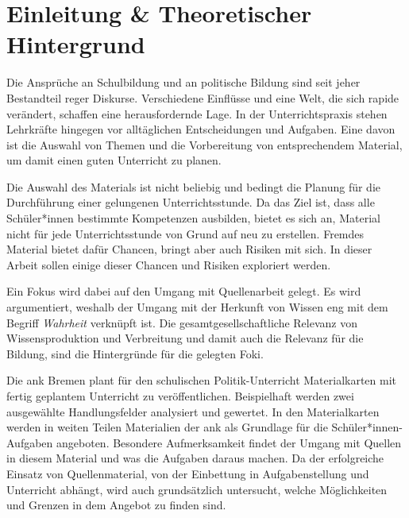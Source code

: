 



\section{Einleitung \& Theoretischer Hintergrund}
Die Ansprüche an Schulbildung und an politische Bildung sind seit jeher Bestandteil reger Diskurse. Verschiedene Einflüsse und eine Welt, die sich rapide verändert, schaffen eine herausfordernde Lage. In der Unterrichtspraxis stehen Lehrkräfte hingegen vor alltäglichen Entscheidungen und Aufgaben. Eine davon ist die Auswahl von Themen und die Vorbereitung von entsprechendem Material, um damit einen guten Unterricht zu planen. 

Die Auswahl des Materials ist nicht beliebig und bedingt die Planung für die Durchführung einer gelungenen Unterrichtsstunde. Da das Ziel ist, dass alle Schüler*innen bestimmte Kompetenzen ausbilden, bietet es sich an, Material nicht für jede Unterrichtsstunde von Grund auf neu zu erstellen. 
Fremdes Material bietet dafür Chancen, bringt aber auch Risiken mit sich. In dieser Arbeit sollen einige dieser Chancen und Risiken exploriert werden. 

Ein Fokus wird dabei auf den Umgang mit Quellenarbeit gelegt. Es wird argumentiert, weshalb der Umgang mit der Herkunft von Wissen eng mit dem Begriff \emph{Wahrheit} verknüpft ist. Die gesamtgesellschaftliche Relevanz von Wissensproduktion und Verbreitung und damit auch die Relevanz für die Bildung, sind die Hintergründe für die gelegten Foki.
\bigskip

Die \gls{ank} Bremen plant für den schulischen Politik-Unterricht Materialkarten mit fertig geplantem Unterricht zu veröffentlichen.
Beispielhaft werden zwei ausgewählte Handlungsfelder analysiert und gewertet. In den Materialkarten werden in weiten Teilen Materialien der \gls{ank} als Grundlage für die Schüler*innen-Aufgaben angeboten. Besondere Aufmerksamkeit findet der Umgang mit Quellen in diesem Material und was die Aufgaben daraus machen. 
Da der erfolgreiche Einsatz von Quellenmaterial, von der Einbettung in Aufgabenstellung und Unterricht abhängt, wird auch grundsätzlich untersucht, welche Möglichkeiten und Grenzen in dem Angebot zu finden sind. 



